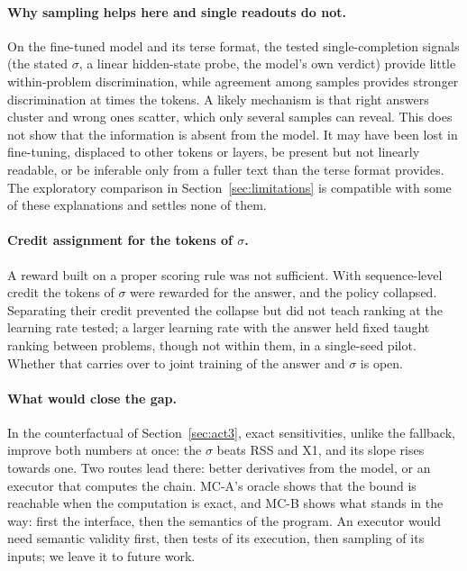 \paragraph{Why sampling helps here and single readouts do not.}
On the fine-tuned model and its terse format, the tested single-completion signals (the stated $\sigma$, a linear
hidden-state probe, the model's own verdict) provide little within-problem discrimination, while agreement among
samples provides stronger discrimination at  times the tokens.
A likely mechanism is that right answers cluster and wrong ones scatter, which only several samples can reveal.
This does not show that the information is absent from the model.
It may have been lost in fine-tuning, displaced to other tokens or layers, be present but not linearly readable, or be
inferable only from a fuller text than the terse format provides.
The exploratory comparison in Section~\ref{sec:limitations} is compatible with some of these explanations and settles
none of them.

\paragraph{Credit assignment for the tokens of $\sigma$.}
A reward built on a proper scoring rule was not sufficient.
With sequence-level credit the tokens of $\sigma$ were rewarded for the answer, and the policy collapsed.
Separating their credit prevented the collapse but did not teach ranking at the learning rate tested; a larger learning
rate with the answer held fixed taught ranking between problems, though not within them, in a single-seed pilot.
Whether that carries over to joint training of the answer and $\sigma$ is open.

\paragraph{What would close the gap.}
In the counterfactual of Section~\ref{sec:act3}, exact sensitivities, unlike the fallback, improve both numbers at once:
the $\sigma$ beats RSS and X1, and its slope rises towards one.
Two routes lead there: better derivatives from the model, or an executor that computes the chain.
MC-A's oracle shows that the bound is reachable when the computation is exact, and MC-B shows what stands in the way:
first the interface, then the semantics of the program.
An executor would need semantic validity first, then tests of its execution, then sampling of its inputs; we leave it
to future work.

